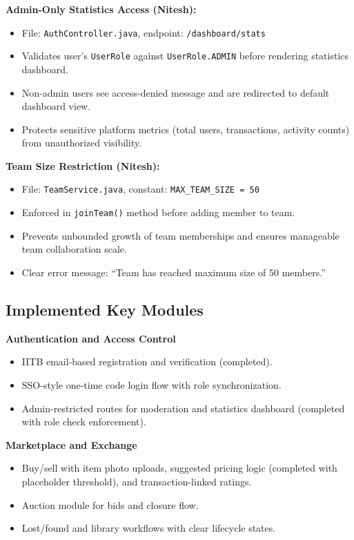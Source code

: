 \documentclass[12pt,a4paper]{article}
\begin{document}
\textbf{Admin-Only Statistics Access (Nitesh):}
\begin{itemize}[leftmargin=*]
    \item File: \texttt{AuthController.java}, endpoint: \texttt{/dashboard/stats}
    \item Validates user's \texttt{UserRole} against \texttt{UserRole.ADMIN} before rendering statistics dashboard.
    \item Non-admin users see access-denied message and are redirected to default dashboard view.
    \item Protects sensitive platform metrics (total users, transactions, activity counts) from unauthorized visibility.
\end{itemize}

\textbf{Team Size Restriction (Nitesh):}
\begin{itemize}[leftmargin=*]
    \item File: \texttt{TeamService.java}, constant: \texttt{MAX\_TEAM\_SIZE = 50}
    \item Enforced in \texttt{joinTeam()} method before adding member to team.
    \item Prevents unbounded growth of team memberships and ensures manageable team collaboration scale.
    \item Clear error message: ``Team has reached maximum size of 50 members.''
\end{itemize}

\subsection{Implemented Key Modules}
\textbf{Authentication and Access Control}
\begin{itemize}[leftmargin=*]
    \item IITB email-based registration and verification (completed).
    \item SSO-style one-time code login flow with role synchronization.
    \item Admin-restricted routes for moderation and statistics dashboard (completed with role check enforcement).
\end{itemize}

\textbf{Marketplace and Exchange}
\begin{itemize}[leftmargin=*]
    \item Buy/sell with item photo uploads, suggested pricing logic (completed with placeholder threshold), and transaction-linked ratings.
    \item Auction module for bids and closure flow.
    \item Lost/found and library workflows with clear lifecycle states.
\end{itemize}
\end{document}
